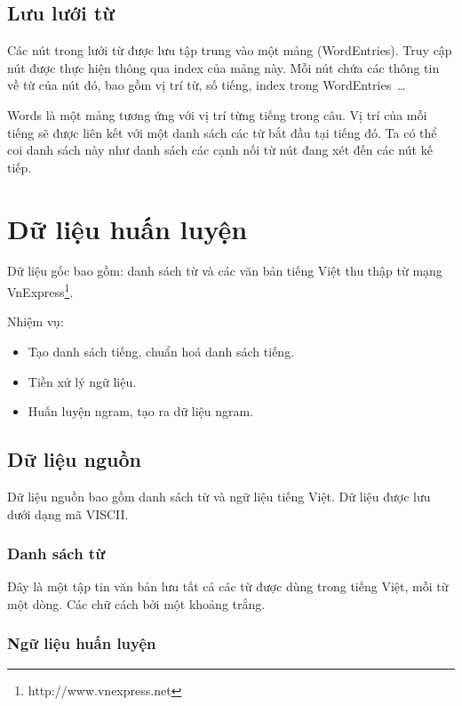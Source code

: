\documentclass[a4paper,oneside,14pt]{extbook} %
\begin{document}
\subsection{Lưu lưới từ}

Các nút trong lưới từ được lưu tập trung vào một mảng
(WordEntries). Truy cập nút được thực hiện thông qua index của mảng
này. Mỗi nút chứa các thông tin về từ của nút đó, bao gồm vị trí từ,
số tiếng, index trong WordEntries~\ldots{}{}

Words là một mảng tương ứng với vị trí từng tiếng trong câu. Vị trí
của mỗi tiếng sẽ được liên kết với một danh sách các từ bắt đầu tại
tiếng đó. Ta có thể coi danh sách này như danh sách các cạnh nối từ
nút đang xét đến các nút kế tiếp.


\section{Dữ liệu huấn luyện}
\label{sec:data-preprocessing}

Dữ liệu gốc bao gồm: danh sách từ và các văn bản tiếng Việt thu thập
từ mạng VnExpress\footnote{http://www.vnexpress.net}.

Nhiệm vụ:
\begin{itemize}
\item Tạo danh sách tiếng, chuẩn hoá danh sách tiếng.
\item Tiền xử lý ngữ liệu.
\item Huấn luyện ngram, tạo ra dữ liệu ngram.
\end{itemize}


\subsection{Dữ liệu nguồn}
\label{sec:data-source}

Dữ liệu nguồn bao gồm danh sách từ và ngữ liệu tiếng Việt. Dữ liệu
được lưu dưới dạng mã VISCII. 
\subsubsection{Danh sách từ}

Đây là một tập tin văn bản lưu tất cả các từ được dùng trong tiếng
Việt, mỗi từ một dòng. Các chữ cách bởi một khoảng trắng.


\subsubsection{Ngữ liệu huấn luyện}
\end{document}
